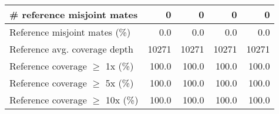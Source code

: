 \documentclass[12pt,a4paper]{article}
\begin{document}
\begin{table}[ht]
\begin{center}
\begin{tabular}{|l*{4}{|r}|}
\# reference misjoint mates & 0 & 0 & 0 & 0 \\ \hline
Reference misjoint mates (\%) & 0.0 & 0.0 & 0.0 & 0.0 \\ \hline
Reference avg. coverage depth & 10271 & 10271 & 10271 & 10271 \\ \hline
Reference coverage $\geq$ 1x (\%) & 100.0 & 100.0 & 100.0 & 100.0 \\ \hline
Reference coverage $\geq$ 5x (\%) & 100.0 & 100.0 & 100.0 & 100.0 \\ \hline
Reference coverage $\geq$ 10x (\%) & 100.0 & 100.0 & 100.0 & 100.0 \\ \hline
\end{tabular}
\end{center}
\end{table}
\end{document}
